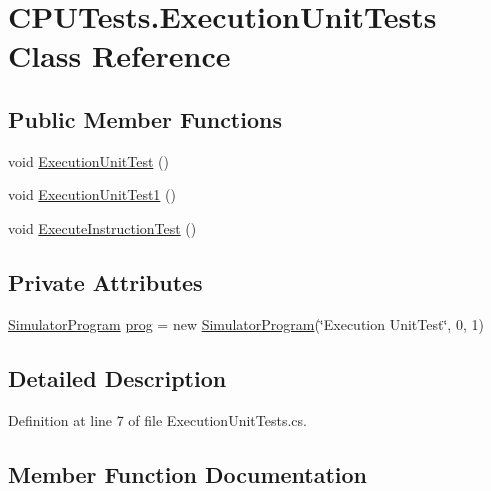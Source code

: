 \hypertarget{class_c_p_u_tests_1_1_execution_unit_tests}{}\section{C\+P\+U\+Tests.\+Execution\+Unit\+Tests Class Reference}
\label{class_c_p_u_tests_1_1_execution_unit_tests}
\subsection*{Public Member Functions}
\begin{DoxyCompactItemize}
\item 
void \hyperlink{class_c_p_u_tests_1_1_execution_unit_tests_ad778721a48d99d7fead832eeff8ffc46}{Execution\+Unit\+Test} ()
\item 
void \hyperlink{class_c_p_u_tests_1_1_execution_unit_tests_ac6676b4cce7c1fbdcee2b8fd9dac854e}{Execution\+Unit\+Test1} ()
\item 
void \hyperlink{class_c_p_u_tests_1_1_execution_unit_tests_a390a999d603172db7a26350392335015}{Execute\+Instruction\+Test} ()
\end{DoxyCompactItemize}
\subsection*{Private Attributes}
\begin{DoxyCompactItemize}
\item 
\hyperlink{class_c_p_u___o_s___simulator_1_1_c_p_u_1_1_simulator_program}{Simulator\+Program} \hyperlink{class_c_p_u_tests_1_1_execution_unit_tests_ae1fcdd0e50525d444de369e0c9edcf14}{prog} = new \hyperlink{class_c_p_u___o_s___simulator_1_1_c_p_u_1_1_simulator_program}{Simulator\+Program}(\char`\"{}Execution Unit\+Test\char`\"{}, 0, 1)
\end{DoxyCompactItemize}


\subsection{Detailed Description}


Definition at line 7 of file Execution\+Unit\+Tests.\+cs.



\subsection{Member Function Documentation}
\hypertarget{class_c_p_u_tests_1_1_execution_unit_tests_a390a999d603172db7a26350392335015}{}
